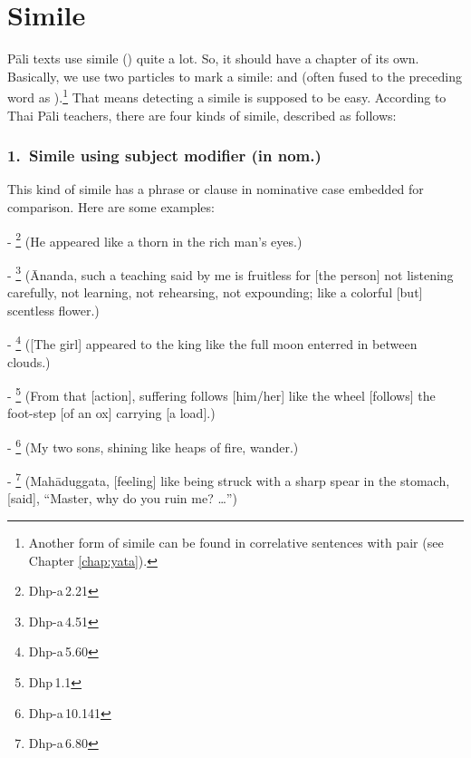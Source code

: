 \chapter{Simile}\label{chap:simile}

P\=ali texts use simile () quite a lot. So, it should have a chapter of its own. Basically, we use two particles to mark a simile:  and  (often fused to the preceding word as ).\footnote{Another form of simile can be found in correlative sentences with  pair (see Chapter \ref{chap:yata}).} That means detecting a simile is supposed to be easy. According to Thai P\=ali teachers, there are four kinds of simile, described as follows:

\subsection*{1.\ Simile using subject modifier (in nom.)}

This kind of simile has a phrase or clause in nominative case embedded for comparison. Here are some examples:\par
- \footnote{Dhp-a\,2.21} (He appeared like a thorn in the rich man's eyes.)\par
- \footnote{Dhp-a\,4.51} (\=Ananda, such a teaching said by me is fruitless for [the person] not listening carefully, not learning, not rehearsing, not expounding; like a colorful [but] scentless flower.)\par
- \footnote{Dhp-a\,5.60} ([The girl] appeared to the king like the full moon enterred in between clouds.)\par
- \footnote{Dhp\,1.1} (From that [action], suffering follows [him/her] like the wheel [follows] the foot-step [of an ox] carrying [a load].)\par
- \footnote{Dhp-a\,10.141} (My two sons, shining like heaps of fire, wander.)\par
- \footnote{Dhp-a\,6.80} (Mah\=aduggata, [feeling] like being struck with a sharp spear in the stomach, [said], ``Master, why do you ruin me? \ldots'')\par

